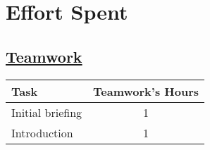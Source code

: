 \chapter{Effort Spent}

\section[Teamwork]{\hyperlink{toc}{Teamwork}}
\vspace{2mm}
\begin{center}
    \begin{tabular}{| l | c |}
        \hline
        \textbf{Task} & \textbf{Teamwork's Hours} \\ \hline
        Initial briefing & 1 \\ \hline
        Introduction & 1 \\ \hline
    \end{tabular}

\end{center}
